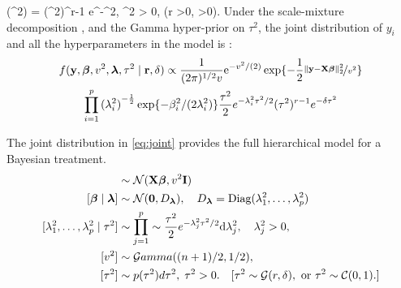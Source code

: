 \documentclass[10pt]{article}
\begin{document}
\beq
\pi(\tau^2) =  (\tau^2)^{r-1} e^{-\delta \tau^2}, \; \tau^2 > 0, \; (r >0, \delta >0).
\eeq
Under the scale-mixture decomposition \label{eq:v_i}, and the Gamma hyper-prior on $\tau^2$, the joint distribution of $y_i$ and all the hyperparameters in the model is :
\begin{multline}
f({\bf y}, \boldsymbol{\beta}, v^2, \boldsymbol{\lambda}, \tau^2 \mid {\bf r}, \delta) \propto 
\frac{1}{(2 \pi)^{1/2} v} {\rm e}^{-{v^2}/({2})} \exp\{- \frac{1}{2} \nicefrac{\lVert{\bf y} - {\bf X} \boldsymbol{\beta}\rVert_2^2 }{v^2}\} \\
\prod_{i=1}^{p} {(\lambda_i^2)}^{-\frac{1}{2}} \exp\{-\beta_i^2/(2\lambda_i^2)\} \frac{\tau^2}{2} e^{-\lambda_i^2\tau^2/2} (\tau^2)^{r-1} e^{-\delta \tau^2} \label{eq:joint}
\end{multline}

The joint distribution in \eqref{eq:joint} provides the full hierarchical model for a Bayesian treatment. 
\begin{align*}
[\y \mid \bbeta, v^2] & \sim \NormRV(\X \bbeta, v^2 \I) \\
[\bbeta \mid \blambda] & \sim \NormRV(\0, D_{\blambda}), \quad D_{\blambda} = \text{Diag}(\lambda_1^2, \ldots, \lambda_p^2) \\
[\lambda_1^2, \ldots, \lambda_p^2 \mid \tau^2] & \sim \prod_{j=1}^{p} \sim \frac{\tau^2}{2} e^{-\lambda_j^2\tau^2/2} \d \lambda_j^2, \quad \lambda_j^2 > 0, \\
[v^2] & \sim \mathcal{G}amma((n+1)/2 , 1/2),  \\
[\tau^2] & \sim p(\tau^2) d\tau^2,  \; \tau^2 > 0. \quad [ \tau^2 \sim \GammaRV(r, \delta), \text{ or } \tau^2 \sim \CauchyRV(0,1). ]
\end{align*}


\end{document}
